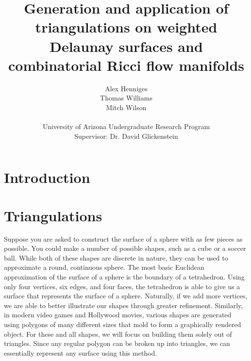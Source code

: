 \documentclass[12pt]{article}
\title{Generation and application of triangulations on weighted Delaunay surfaces and combinatorial Ricci flow manifolds}
\author{Alex Henniges \\ Thomas Williams \\ Mitch Wilson \\ \\ University of Arizona Undergraduate Research Program\\
Supervisor: Dr. David Glickenstein\\
}
\begin{document}
\maketitle
\thispagestyle{empty}
\newpage
\renewcommand\contentsname{Table of Contents}
\tableofcontents

\newpage
\section{Introduction}


\section{Triangulations}
\label{Triangulationschap}

Suppose you are asked to construct the surface of a sphere with as few pieces as possible. You could make a number of possible shapes, such as a cube or a soccer ball. While both of these shapes are discrete in nature, they can be used to approximate a round, continuous sphere. The most basic Euclidean approximation of the surface of a sphere is the boundary of a tetrahedron. Using only four vertices, six edges, and four faces, the tetrahedron is able to give us a surface that represents the surface of a sphere. Naturally, if we add more vertices, we are able to better illustrate our shapes through greater refinement. Similarly, in modern video games and Hollywood movies, various shapes are generated using polygons of many different sizes that mold to form a graphically rendered object. For these and all shapes, we will focus on building them solely out of triangles. Since any regular polygon can be broken up into triangles, we can essentially represent any surface using this method. \newline
\end{document}

